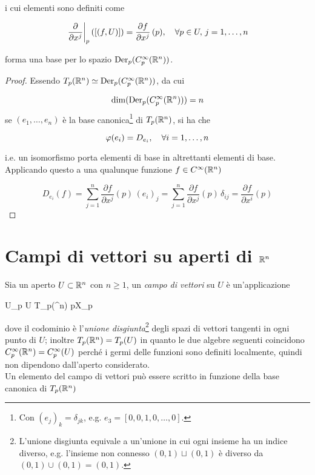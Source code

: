 i cui elementi sono definiti come

\begin{equation}
	\eval{ \pdv{x^{j}} }_{p} ([(f,U)]) = \pdv{f}{x^{j}} \, (p) \qcomma \forall p \in U, \, j = 1, \dots, n
\end{equation}

forma una base per lo spazio $ \operatorname{Der}_{p}(C_{p}^{\infty}(\mathbb{R}^{n})) $.

\begin{proof}
	Essendo $ T_{p}(\mathbb{R}^{n}) \simeq \operatorname{Der}_{p}(C_{p}^{\infty}(\mathbb{R}^{n})) $, da cui
	
	\begin{equation}
		\dim ( \operatorname{Der}_{p}(C_{p}^{\infty}(\mathbb{R}^{n})) ) = n
	\end{equation}
	se $ (e_{1},\dots,e_{n}) $ è la base canonica\footnote{%
		Con $ (e_{j})_{k} = \delta_{jk} $, e.g. $ e_{3} = [0,0,1,0,\dots,0] $.%
	} di $ T_{p}(\mathbb{R}^{n}) $, si ha che

	\begin{equation}
		\varphi(e_{i}) = D_{e_{i}} \qcomma \forall i=1,\dots,n
	\end{equation}

	i.e. un isomorfismo porta elementi di base in altrettanti elementi di base. \\
	Applicando questo a una qualunque funzione $ f \in C^{\infty} (\mathbb{R}^{n}) $
	
	\begin{equation}
		D_{e_{i}} (f) = \sum_{j=1}^{n} \dfrac{\partial f}{\partial x^{j}} (p) \, (e_{i})_{j} = \sum_{j=1}^{n} \dfrac{\partial f}{\partial x^{j}} (p) \, \delta_{ij} = \dfrac{\partial f}{\partial x^{i}} (p)
	\end{equation}
\end{proof}

\section{Campi di vettori su aperti di $ \mathbb{R}^{n} $}

Sia un aperto $ U \subset \mathbb{R}^{n} $ con $ n \geqslant 1 $, un \textit{campo di vettori} su $ U $ è un'applicazione

	{U}{\bigsqcup_{p \in U} T_{p}(\R^{n})}
	{p}{X_{p}}

dove il codominio è l'\textit{unione disgiunta}\footnote{%
	L'unione disgiunta equivale a un'unione in cui ogni insieme ha un indice diverso, e.g. l'insieme non connesso $ (0,1) \sqcup (0,1) $ è diverso da $ (0,1) \cup (0,1) = (0,1) $.%
} degli spazi di vettori tangenti in ogni punto di $ U $; inoltre $ T_{p}(\mathbb{R}^{n}) = T_{p}(U) $ in quanto le due algebre seguenti coincidono $ C_{p}^{\infty}(\mathbb{R}^{n}) = C_{p}^{\infty}(U) $ perché i germi delle funzioni sono definiti localmente, quindi non dipendono dall'aperto considerato. \\
Un elemento del campo di vettori può essere scritto in funzione della base canonica di $ T_{p}(\mathbb{R}^{n}) $

